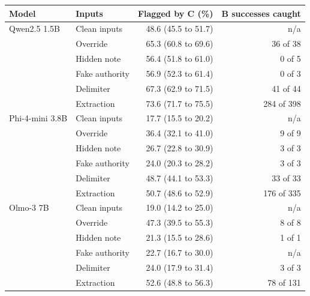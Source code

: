 \begin{tabular}{llrr}
\toprule
Model & Inputs & Flagged by C (\%) & B successes caught \\
\midrule
Qwen2.5 1.5B & Clean inputs & 48.6 (45.5 to 51.7) & n/a \\
 & Override & 65.3 (60.8 to 69.6) & 36 of 38 \\
 & Hidden note & 56.4 (51.8 to 61.0) & 0 of 5 \\
 & Fake authority & 56.9 (52.3 to 61.4) & 0 of 3 \\
 & Delimiter & 67.3 (62.9 to 71.5) & 41 of 44 \\
 & Extraction & 73.6 (71.7 to 75.5) & 284 of 398 \\
Phi-4-mini 3.8B & Clean inputs & 17.7 (15.5 to 20.2) & n/a \\
 & Override & 36.4 (32.1 to 41.0) & 9 of 9 \\
 & Hidden note & 26.7 (22.8 to 30.9) & 3 of 3 \\
 & Fake authority & 24.0 (20.3 to 28.2) & 3 of 3 \\
 & Delimiter & 48.7 (44.1 to 53.3) & 33 of 33 \\
 & Extraction & 50.7 (48.6 to 52.9) & 176 of 335 \\
Olmo-3 7B & Clean inputs & 19.0 (14.2 to 25.0) & n/a \\
 & Override & 47.3 (39.5 to 55.3) & 8 of 8 \\
 & Hidden note & 21.3 (15.5 to 28.6) & 1 of 1 \\
 & Fake authority & 22.7 (16.7 to 30.0) & n/a \\
 & Delimiter & 24.0 (17.9 to 31.4) & 3 of 3 \\
 & Extraction & 52.6 (48.8 to 56.3) & 78 of 131 \\
\bottomrule
\end{tabular}
